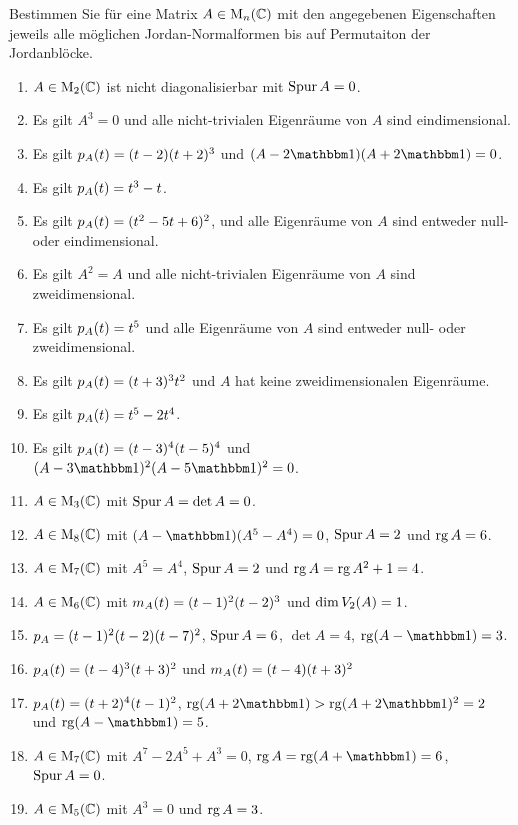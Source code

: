 \documentclass[a4paper, 10pt]{scrartcl}
\begin{document}
\begin{question}
  Bestimmen Sie für eine Matrix $A \in \matrices{n}{\Complex}$ mit den angegebenen Eigenschaften jeweils alle möglichen Jordan-Normalformen bis auf Permutaiton der Jordanblöcke.
  \begin{enumerate}
    \item
      $A\in \matrices{2}{\Complex}$ ist nicht diagonalisierbar mit $\tr A = 0$.
    \item
      Es gilt $A^3 = 0$ und alle nicht-trivialen Eigenräume von $A$ sind eindimensional.
    \item
      Es gilt $\charpol{A}(t) = (t-2)(t+2)^3$ und $(A - 2 \Id)(A + 2 \Id) = 0$.
    \item
      Es gilt $\charpol{A}(t) = t^3 - t$.
    \item
      Es gilt $\charpol{A}(t) = (t^2 - 5t + 6)^2$, und alle Eigenräume von $A$ sind entweder null- oder eindimensional.
    \item
      Es gilt $A^2 = A$ und alle nicht-trivialen Eigenräume von $A$ sind zweidimensional.
    \item
      Es gilt $\charpol{A}(t) = t^5$ und alle Eigenräume von $A$ sind entweder null- oder zweidimensional.
    \item
      Es gilt $\charpol{A}(t) = (t + 3)^3 t^2$ und $A$ hat keine zweidimensionalen Eigenräume.
    \item
      Es gilt $\charpol{A}(t) = t^5 -2 t^4$.
    \item
      Es gilt $\charpol{A}(t) = (t-3)^4 (t-5)^4$ und $(A - 3 \Id)^2 (A - 5 \Id)^2 = 0$.
    \item
      $A \in \matrices{3}{\Complex}$ mit $\tr A = \det A = 0$.
    \item
      $A \in \matrices{8}{\Complex}$ mit $(A - \Id)(A^5 - A^4) = 0$, $\tr A = 2$ und $\rank A = 6$.
    \item
      $A \in \matrices{7}{\Complex}$ mit $A^5 = A^4$, $\tr A = 2$ und $\rank A = \rank A^2 + 1 = 4$.
    \item
      $A \in \matrices{6}{\Complex}$ mit $\minpol{A}(t) = (t-1)^2 (t-2)^3$ und $\dim \eigenspace{V}{A}{2} = 1$.
    \item
      $\charpol{A} = (t-1)^2 (t-2) (t-7)^2$, $\tr A = 6$, $\det A = 4$, $\rank (A - \Id) = 3$.
    \item
      $\charpol{A}(t) = (t-4)^3 (t+3)^2$ und $\minpol{A}(t) = (t-4) (t+3)^2$
    \item
      $\charpol{A}(t) = (t+2)^4 (t-1)^2$, $\rank (A + 2 \Id) > \rank (A + 2 \Id)^2 = 2$ und $\rank (A - \Id) = 5$.
    \item
      $A \in \matrices{7}{\Complex}$ mit $A^7 - 2 A^5 + A^3 = 0$, $\rank A = \rank(A + \Id) = 6$, $\tr A = 0$.
    \item
      $A \in \matrices{5}{\Complex}$ mit $A^3 = 0$ und $\rank A = 3$.
  \end{enumerate}
\end{question}
\end{document}
